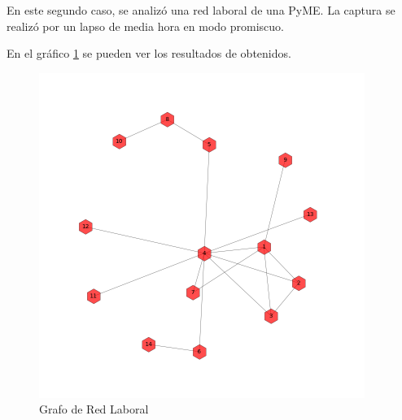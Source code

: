 En este segundo caso, se analizó una red laboral de una PyME. La captura se realizó por un lapso de media hora en modo promiscuo.

En el gráfico \ref{laboral:graph} se pueden ver los resultados de obtenidos.

\begin{figure}[h!]
    \centering                                                       
    \includegraphics[width=300pt]{img/laboralGraph.png}
    \caption{Grafo de Red Laboral}
    \label{laboral:graph}
\end{figure}

